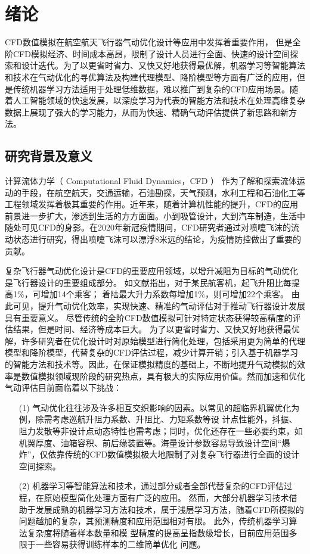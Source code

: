 \chapter{绪论}
CFD数值模拟在航空航天飞行器气动优化设计等应用中发挥着重要作用，
但是全阶CFD模拟经济、时间成本高昂，限制了设计人员进行全面、快速的设计空间探索和设计迭代。为了以更省时省力、又快又好地获得最优解，机器学习等智能算法和技术在气动优化的寻优算法及构建代理模型、降阶模型等方面有广泛的应用，但是传统机器学习方法适用于处理低维数据，难以推广到复杂的CFD应用场景。随着人工智能领域的快速发展，以深度学习为代表的智能方法和技术在处理高维复杂数据上展现了强大的学习能力，从而为快速、精确气动评估提供了新思路和新方法。



\section{研究背景及意义}
计算流体力学（ Computational Fluid Dynamics，CFD ）
作为了解和探索流体运动的手段，在航空航天，交通运输，石油勘探，天气预测，水利工程和石油化工等工程领域发挥着极其重要的作用。近年来，随着计算机性能的提升，CFD的应用前景进一步扩大，渗透到生活的方方面面。小到吸管设计，大到汽车制造，生活中随处可见CFD的身影。在2020年新冠疫情期间，CFD研究者通过对喷嚏飞沫的流动状态进行研究，得出喷嚏飞沫可以漂浮8米远的结论，为疫情防控做出了重要的贡献\cite{JAMA-喷嚏}。

复杂飞行器气动优化设计是CFD的重要应用领域，以增升减阻为目标的气动优化是飞行器设计的重要组成部分。
如文献\cite{增升减阻ep}指出，对于某民航客机，起飞升阻比每提高1\%，可增加14个乘客；
着陆最大升力系数每增加1\%，则可增加22个乘客。
由此可见，提升气动优化效率，实现快速、精准的气动评估对于推动飞行器设计发展具有重要意义。
尽管传统的全阶CFD数值模拟可针对特定状态获得较高精度的评估结果，但是时间、经济等成本巨大。
为了以更省时省力、又快又好地获得最优解，许多研究者在优化设计时对原始模型进行简化处理，包括采用更为简单的代理模型\cite{代理模型}和降阶模型\cite{降阶模型}，代替复杂的CFD评估过程，减少计算开销；引入基于机器学习的智能方法和技术等。因此，在保证模拟精度的基础上，不断地提升气动模拟的效率是数值模拟领域现阶段的研究热点，具有极大的实际应用价值。然而加速和优化气动评估目前面临着以下挑战：

\vspace{-0.2cm}
\begin{itemize}
	\item[(1)] 气动优化往往涉及许多相互交织影响的因素。以常见的超临界机翼优化为例，除需考虑巡航升阻力系数、升阻比、力矩系数等设
	计点性能外，抖振、阻力发散等非设计点动态特性也需考虑；同时，优化还存在一些必要约束，如机翼厚度、油箱容积、前后缘装置等。海量设计参数容易导致设计空间“爆炸”，仅依靠传统的CFD数值模拟极大地限制了对复杂飞行器进行全面的设计空间探索。
	\item[(2)] 机器学习等智能算法和技术，通过部分或者全部代替复杂的CFD评估过程，在原始模型简化处理方面有广泛的应用。
	然而，大部分机器学习技术借助于发展成熟的机器学习方法和技术，属于浅层学习方法，随着CFD所模拟的问题越加的复杂，其预测精度和应用范围相对有限。
	此外，传统机器学习算法复杂度将随着样本数量和模
	型精度的提高呈指数级增长，目前应用范围多限于一些容易获得训练样本的二维简单优化
	问题。

\end{itemize}

